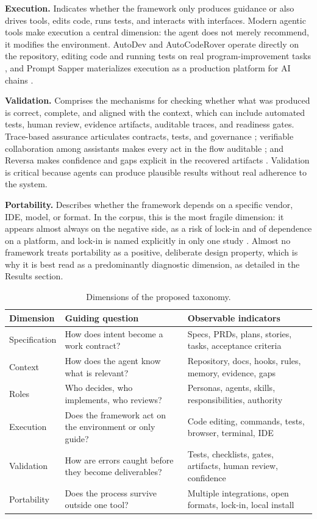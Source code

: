 \noindent\textbf{Execution.} Indicates whether the framework only produces guidance or also drives tools, edits code, runs tests, and interacts with interfaces. Modern agentic tools make execution a central dimension: the agent does not merely recommend, it modifies the environment. AutoDev and AutoCodeRover operate directly on the repository, editing code and running tests on real program-improvement tasks \cite{MicheleTufano2024,YuntongZhang2024}, and Prompt Sapper materializes execution as a production platform for AI chains \cite{YuCheng2023}.

\noindent\textbf{Validation.} Comprises the mechanisms for checking whether what was produced is correct, complete, and aligned with the context, which can include automated tests, human review, evidence artifacts, auditable traces, and readiness gates. Trace-based assurance articulates contracts, tests, and governance \cite{Paduraru2026}; verifiable collaboration among assistants makes every act in the flow auditable \cite{Merchant2025}; and Reversa makes confidence and gaps explicit in the recovered artifacts \cite{Macedo2026}. Validation is critical because agents can produce plausible results without real adherence to the system.

\noindent\textbf{Portability.} Describes whether the framework depends on a specific vendor, IDE, model, or format. In the corpus, this is the most fragile dimension: it appears almost always on the negative side, as a risk of lock-in and of dependence on a platform, and lock-in is named explicitly in only one study \cite{SeyedmoeinMohsenimofidi2025}. Almost no framework treats portability as a positive, deliberate design property, which is why it is best read as a predominantly diagnostic dimension, as detailed in the Results section.

\begin{table}[h!]
\centering
\caption{Dimensions of the proposed taxonomy.}
\label{tab:taxonomia}
\small
\begin{tabularx}{\textwidth}{p{2.8cm}Y Y}
\toprule
\textbf{Dimension} & \textbf{Guiding question} & \textbf{Observable indicators} \\
\midrule
Specification & How does intent become a work contract? & Specs, PRDs, plans, stories, tasks, acceptance criteria \\
Context & How does the agent know what is relevant? & Repository, docs, hooks, rules, memory, evidence, gaps \\
Roles & Who decides, who implements, who reviews? & Personas, agents, skills, responsibilities, authority \\
Execution & Does the framework act on the environment or only guide? & Code editing, commands, tests, browser, terminal, IDE \\
Validation & How are errors caught before they become deliverables? & Tests, checklists, gates, artifacts, human review, confidence \\
Portability & Does the process survive outside one tool? & Multiple integrations, open formats, lock-in, local install \\
\bottomrule
\end{tabularx}
\end{table}
